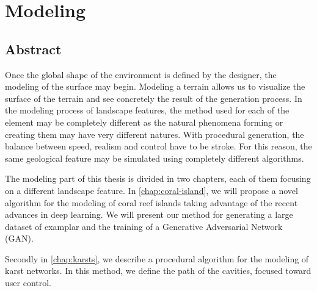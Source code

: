 \part{Modeling}

\chapter*{Abstract}
\label{chap:modelisation-abstract}

Once the global shape of the environment is defined by the designer, the modeling of the surface may begin. Modeling a terrain allows us to visualize the surface of the terrain and see concretely the result of the generation process. In the modeling process of landscape features, the method used for each of the element may be completely different as the natural phenomena forming or creating them may have very different natures. With procedural generation, the balance between speed, realism and control have to be stroke. For this reason, the same geological feature may be simulated using completely different algorithms.

The modeling part of this thesis is divided in two chapters, each of them focusing on a different landscape feature. In \cref{chap:coral-island}, we will propose a novel algorithm for the modeling of coral reef islands taking advantage of the recent advances in deep learning. We will present our method for generating a large dataset of examplar and the training of a Generative Adversarial Network (GAN).

Secondly in \cref{chap:karsts}, we describe a procedural algorithm for the modeling of karst networks. In this method, we define the path of the cavities, focused toward user control.



